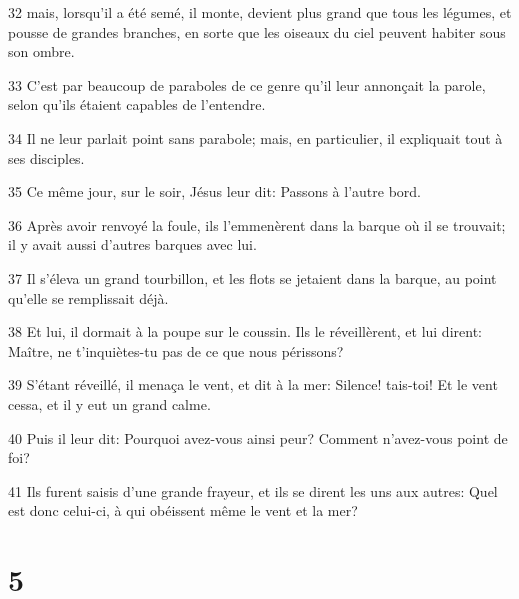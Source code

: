 \par 32 mais, lorsqu'il a été semé, il monte, devient plus grand que tous les légumes, et pousse de grandes branches, en sorte que les oiseaux du ciel peuvent habiter sous son ombre.
\par 33 C'est par beaucoup de paraboles de ce genre qu'il leur annonçait la parole, selon qu'ils étaient capables de l'entendre.
\par 34 Il ne leur parlait point sans parabole; mais, en particulier, il expliquait tout à ses disciples.
\par 35 Ce même jour, sur le soir, Jésus leur dit: Passons à l'autre bord.
\par 36 Après avoir renvoyé la foule, ils l'emmenèrent dans la barque où il se trouvait; il y avait aussi d'autres barques avec lui.
\par 37 Il s'éleva un grand tourbillon, et les flots se jetaient dans la barque, au point qu'elle se remplissait déjà.
\par 38 Et lui, il dormait à la poupe sur le coussin. Ils le réveillèrent, et lui dirent: Maître, ne t'inquiètes-tu pas de ce que nous périssons?
\par 39 S'étant réveillé, il menaça le vent, et dit à la mer: Silence! tais-toi! Et le vent cessa, et il y eut un grand calme.
\par 40 Puis il leur dit: Pourquoi avez-vous ainsi peur? Comment n'avez-vous point de foi?
\par 41 Ils furent saisis d'une grande frayeur, et ils se dirent les uns aux autres: Quel est donc celui-ci, à qui obéissent même le vent et la mer?

\chapter{5}

